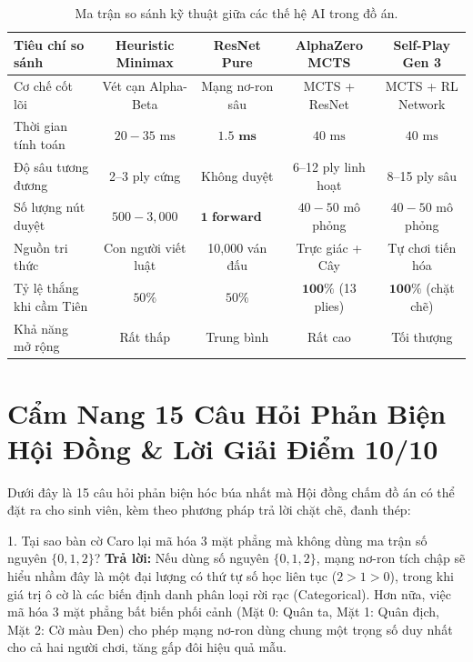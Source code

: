 \documentclass[12pt,a4paper,oneside]{report}
\begin{document}
\begin{table}[htbp]
\centering
\caption{Ma trận so sánh kỹ thuật giữa các thế hệ AI trong đồ án.}
\label{tab:master_comparison}
\begin{tabular}{lcccc}
\toprule
\textbf{Tiêu chí so sánh} & \textbf{Heuristic Minimax} & \textbf{ResNet Pure} & \textbf{AlphaZero MCTS} & \textbf{Self-Play Gen 3}\\
\midrule
Cơ chế cốt lõi & Vét cạn Alpha-Beta & Mạng nơ-ron sâu & MCTS + ResNet & MCTS + RL Network\\
Thời gian tính toán & $20 - 35\text{ ms}$ & $\mathbf{1.5\text{ ms}}$ & $40\text{ ms}$ & $40\text{ ms}$\\
Độ sâu tương đương & 2--3 ply cứng & Không duyệt & 6--12 ply linh hoạt & 8--15 ply sâu\\
Số lượng nút duyệt & $500 - 3,000$ & $\mathbf{1\text{ forward pass}}$ & $40 - 50$ mô phỏng & $40 - 50$ mô phỏng\\
Nguồn tri thức & Con người viết luật & 10,000 ván đấu & Trực giác + Cây & Tự chơi tiến hóa\\
Tỷ lệ thắng khi cầm Tiên & $50\%$ & $50\%$ & $\mathbf{100\%}$ (13 plies) & $\mathbf{100\%}$ (chặt chẽ)\\
Khả năng mở rộng & Rất thấp & Trung bình & Rất cao & Tối thượng\\
\bottomrule
\end{tabular}
\end{table}

\chapter{Cẩm Nang 15 Câu Hỏi Phản Biện Hội Đồng \& Lời Giải Điểm 10/10}

Dưới đây là 15 câu hỏi phản biện hóc búa nhất mà Hội đồng chấm đồ án có thể đặt ra cho sinh viên, kèm theo phương pháp trả lời chặt chẽ, đanh thép:

\begin{defensebox}{1. Tại sao bàn cờ Caro lại mã hóa 3 mặt phẳng mà không dùng ma trận số nguyên $\{0, 1, 2\}$?}
\textbf{Trả lời:} Nếu dùng số nguyên $\{0, 1, 2\}$, mạng nơ-ron tích chập sẽ hiểu nhầm đây là một đại lượng có thứ tự số học liên tục ($2 > 1 > 0$), trong khi giá trị ô cờ là các biến định danh phân loại rời rạc (Categorical). Hơn nữa, việc mã hóa 3 mặt phẳng bất biến phối cảnh (Mặt 0: Quân ta, Mặt 1: Quân địch, Mặt 2: Cờ màu Đen) cho phép mạng nơ-ron dùng chung một trọng số duy nhất cho cả hai người chơi, tăng gấp đôi hiệu quả mẫu.
\end{defensebox}
\end{document}
